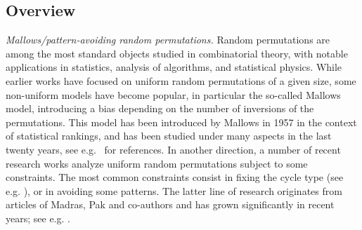 \documentclass[a4paper,11pt]{amsart}
\theoremstyle{definition}
\begin{document}
\subsection{Overview}
\label{ssec:background}
{\em Mallows/pattern-avoiding random permutations.}
Random permutations are among the most standard objects studied in combinatorial theory,
with notable applications in statistics, analysis of algorithms, and statistical physics.
While earlier works have focused on uniform random permutations of a given size,
some non-uniform models have become popular, in particular the so-called Mallows model,
introducing a bias depending on the number of inversions of the permutations.
This model has been introduced by Mallows in 1957 \cite{mallows1957} in the context of statistical rankings,
and has been studied under many aspects in the last twenty years, see e.g.~\cite{dubach2024mallows} for references.
In another direction, a number of recent research works analyze uniform random permutations
subject to some constraints. 
The most common constraints consist in fixing the cycle type 
(see e.g. \cite{feray2024clt_conjugacy,dubach2025geometric,hamaker2025moments}),
or in avoiding some patterns. 
The latter line of research originates from articles of Madras, Pak and co-authors 
and has grown significantly in recent years; 
see e.g. \cite{madras2010random_pattern_avoiding,MinerPak,hoffman2019scaling,bassino2022scaling,borga2022strong-semi-baxter}.
\bigskip
\end{document}

